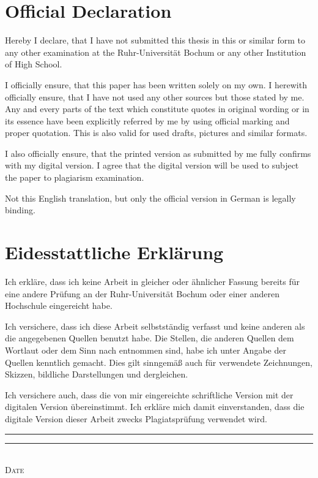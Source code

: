 \thispagestyle{empty}
\section*{Official Declaration}
Hereby I declare, that I have not submitted this thesis in this or similar form to any other examination at the Ruhr-Universität Bochum or any other Institution of High School.

\noindent
I officially ensure, that this paper has been written solely on my own.
I herewith officially ensure, that I have not used any other sources but those stated by me.
Any and every parts of the text which constitute quotes in original wording or in its essence have been explicitly referred by me by using official marking and proper quotation.
This is also valid for used drafts, pictures and similar formats.

\noindent
I also officially ensure, that the printed version as submitted by me fully confirms with my digital version.
I agree that the digital version will be used to subject the paper to plagiarism examination.

\noindent
Not this English translation, but only the official version in German is legally binding\@.

\section*{Eidesstattliche Erklärung}
{
Ich erkläre, dass ich keine Arbeit in gleicher oder ähnlicher Fassung bereits für eine andere Prüfung an der Ruhr-Universität Bochum oder einer anderen Hochschule eingereicht habe.

\noindent
Ich versichere, dass ich diese Arbeit selbstständig verfasst und keine anderen als die angegebenen Quellen benutzt habe. Die Stellen, die anderen Quellen dem Wortlaut oder dem Sinn nach entnommen sind, habe ich unter Angabe der Quellen kenntlich gemacht.
Dies gilt sinngemäß auch für verwendete Zeichnungen, Skizzen, bildliche Darstellungen und dergleichen.

\noindent
Ich versichere auch, dass die von mir eingereichte schriftliche Version mit der digitalen Version übereinstimmt.
Ich erkläre mich damit einverstanden, dass die digitale Version dieser Arbeit zwecks Plagiatsprüfung verwendet wird.\@}

\vspace{2cm}
\rule{4cm}{0.1pt} \hfill \rule{7cm}{0.1pt} \\
\hspace*{1.5cm} \textsc{Date} \hspace*{7cm} \textsc{\@author}

